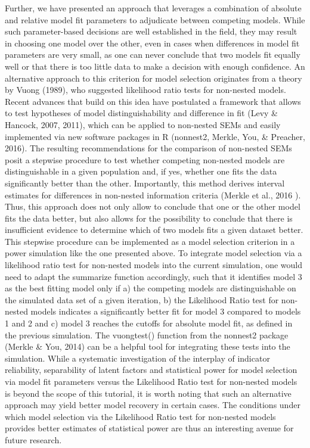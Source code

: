 \documentclass[
  man,floatsintext]{apa6}
\begin{document}
Further, we have presented an approach that leverages a combination of absolute and relative model fit parameters to adjudicate between competing models. While such parameter-based decisions are well established in the field, they may result in choosing one model over the other, even in cases when differences in model fit parameters are very small, as one can never conclude that two models fit equally well or that there is too little data to make a decision with enough confidence. An alternative approach to this criterion for model selection originates from a theory by Vuong (1989), who suggested likelihood ratio tests for non-nested models. Recent advances that build on this idea have postulated a framework that allows to test hypotheses of model distinguishability and difference in fit (Levy \& Hancock, 2007, 2011), which can be applied to non-nested SEMs and easily implemented via new software packages in R (nonnest2, Merkle, You, \& Preacher, 2016). The resulting recommendations for the comparison of non-nested SEMs posit a stepwise procedure to test whether competing non-nested models are distinguishable in a given population and, if yes, whether one fits the data significantly better than the other. Importantly, this method derives interval estimates for differences in non-nested information criteria (Merkle et al., 2016 ). Thus, this approach does not only allow to conclude that one or the other model fits the data better, but also allows for the possibility to conclude that there is insufficient evidence to determine which of two models fits a given dataset better. This stepwise procedure can be implemented as a model selection criterion in a power simulation like the one presented above. To integrate model selection via a likelihood ratio test for non-nested models into the current simulation, one would need to adapt the summarize function accordingly, such that it identifies model 3 as the best fitting model only if a) the competing models are distinguishable on the simulated data set of a given iteration, b) the Likelihood Ratio test for non-nested models indicates a significantly better fit for model 3 compared to models 1 and 2 and c) model 3 reaches the cutoffs for absolute model fit, as defined in the previous simulation. The vuongtest() function from the nonnest2 package (Merkle \& You, 2014) can be a helpful tool for integrating these tests into the simulation. While a systematic investigation of the interplay of indicator reliability, separability of latent factors and statistical power for model selection via model fit parameters versus the Likelihood Ratio test for non-nested models is beyond the scope of this tutorial, it is worth noting that such an alternative approach may yield better model recovery in certain cases. The conditions under which model selection via the Likelihood Ratio test for non-nested models provides better estimates of statistical power are thus an interesting avenue for future research.
\end{document}
